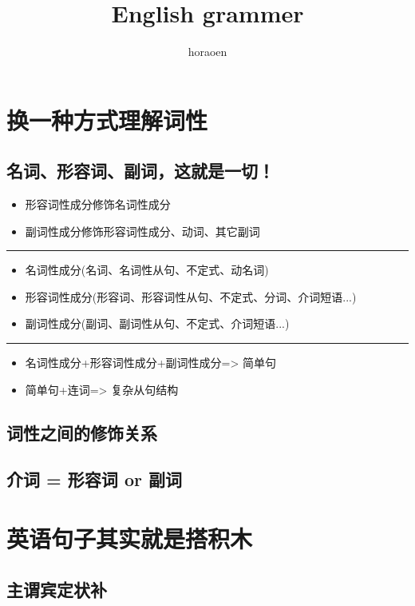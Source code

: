 \documentclass{ctexart}
\title{English grammer}
\author{horaoen}
\begin{document}
  \maketitle
  \section{换一种方式理解词性}
  \subsection{名词、形容词、副词，这就是一切！}
  \begin{itemize}
    \item 形容词性成分修饰名词性成分
    \item 副词性成分修饰形容词性成分、动词、其它副词
  \end{itemize}

  \hrule
  \begin{itemize}
    \item 名词性成分(名词、名词性从句、不定式、动名词)
    \item 形容词性成分(形容词、形容词性从句、不定式、分词、介词短语...)
    \item 副词性成分(副词、副词性从句、不定式、介词短语...)
  \end{itemize}

  \hrule
  \begin{itemize}
    \item 名词性成分+形容词性成分+副词性成分=> 简单句
    \item 简单句+连词=> 复杂从句结构
  \end{itemize}
  \subsection{词性之间的修饰关系}
  \subsection{介词 = 形容词 or 副词}
  \section{英语句子其实就是搭积木}
  \subsection{主谓宾定状补}
\end{document}
